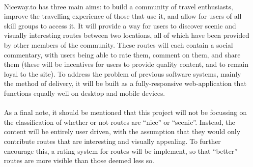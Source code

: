 \ \\
Niceway.to has three main aims: to build a community of travel enthusiasts, improve the travelling experience of those that use it, and allow for users of all skill groups to access it. It will provide a way for users to discover scenic and visually interesting routes between two locations, all of which have been provided by other members of the community. These routes will each contain a social commentary, with users being able to rate them, comment on them, and share them (these will be incentives for users to provide quality content, and to remain loyal to the site). To address the problem of previous software systems, mainly the method of delivery, it will be built as a fully-responsive web-application that functions equally well on desktop and mobile devices. \ \\
\ \\
As a final note, it should be mentioned that this project will not be focussing on the classification of whether or not routes are ``nice'' or ``scenic''. Instead, the content will be entirely user driven, with the assumption that they would only contribute routes that are interesting and visually appealing. To further encourage this, a rating system for routes will be implement, so that ``better'' routes are more visible than those deemed less so.
